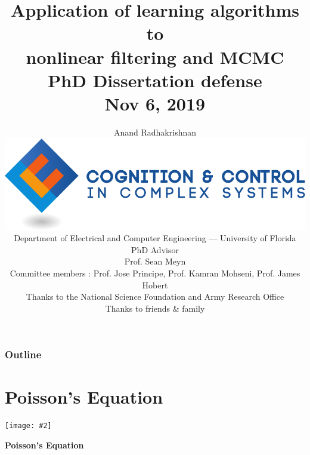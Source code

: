 \documentclass[xcolor=dvipsnames, subsection=false]{beamer}
\def\alertc#1{\alert{\color{MyDarkBlue}  #1}}
\def\alertc#1{\alert{\color{MyDarkBlue}  #1}}
\newcounter{temp}
\newenvironment{framesection}%
{\setcounter{temp}{\value{framenumber}}
\begin{frame}
\thispagestyle{empty}
}%
{\end{frame}\setcounter{framenumber}{\value{temp}}}
\def\Ebox#1#2{%
	\begin{center}
		\texttt{[image: \#2]} %
	\end{center}}
\begin{document}
\thispagestyle{empty}
\setcounter{page}{0}



\title{\Large
	\textbf{Application of learning algorithms to
		\\
		nonlinear filtering and MCMC}
	\\[.5em]
	\normalsize
	PhD Dissertation defense
	\\[.5em]
	\scriptsize
	Nov 6, 2019}

\author{
	\small Anand Radhakrishnan
	\\[.2cm]
	\href{http://ccc.centers.ufl.edu/}{\includegraphics[width=.2\hsize]{c3logocmyk.pdf}}
	\\[.2cm]
	\small
	\scriptsize
	Department of Electrical and Computer Engineering
	---
	University of Florida
	\\[.3cm]\color{Sepia}
	\scriptsize
	PhD Advisor
	\\[.25em]
	\alertc{Prof. Sean Meyn}
	\\[.25cm]
	Committee members : \alertc{Prof. Jose Principe, Prof. Kamran Mohseni, Prof. James Hobert}
	\\[.25cm]
	\scriptsize \color{Sepia} 
	Thanks to the National Science Foundation and Army Research Office \\
   \scriptsize \color{Sepia}
   Thanks to friends \& family}
\date{}

\frame{\titlepage}

\begin{frame}
  \thispagestyle{empty}
  \setcounter{framenumber}{0}

  \frametitle{Outline}
  \framesubtitle{}
  \tableofcontents
\end{frame}


\section{Poisson's Equation}

\begin{framesection}
	
	
	\Ebox{.6}{FishBanner.pdf}
	
	\vfill
	
	\centerline{\Large\bf Poisson's Equation}
	
\end{framesection}
\end{document}
